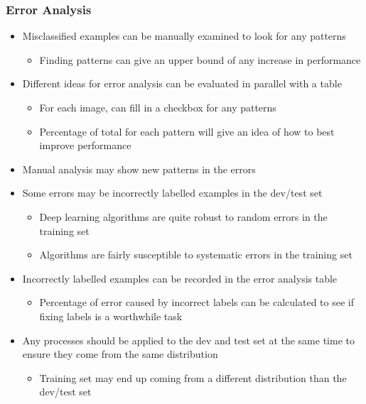 \documentclass[12pt, letterpaper]{article}
\begin{document}
    \subsubsection{Error Analysis}
    \begin{itemize}
        \item Misclassified examples can be manually examined to look for any patterns
        \begin{itemize}
            \item Finding patterns can give an upper bound of any increase in performance 
        \end{itemize}
        \item Different ideas for error analysis can be evaluated in parallel with a table
        \begin{itemize}
            \item For each image, can fill in a checkbox for any patterns
            \item Percentage of total for each pattern will give an idea of how to best improve performance
        \end{itemize}
        \item Manual analysis may show new patterns in the errors
        \item Some errors may be incorrectly labelled examples in the dev/test set
        \begin{itemize}
            \item Deep learning algorithms are quite robust to random errors in the training set
            \item Algorithms are fairly susceptible to systematic errors in the training set 
        \end{itemize}
        \item Incorrectly labelled examples can be recorded in the error analysis table
        \begin{itemize}
            \item Percentage of error caused by incorrect labels can be calculated to see if fixing labels is a worthwhile task
        \end{itemize}
        \item Any processes should be applied to the dev and test set at the same time to ensure they come from the same distribution
        \begin{itemize}
            \item Training set may end up coming from a different distribution than the dev/test set
        \end{itemize}

\end{itemize}
\end{document}
